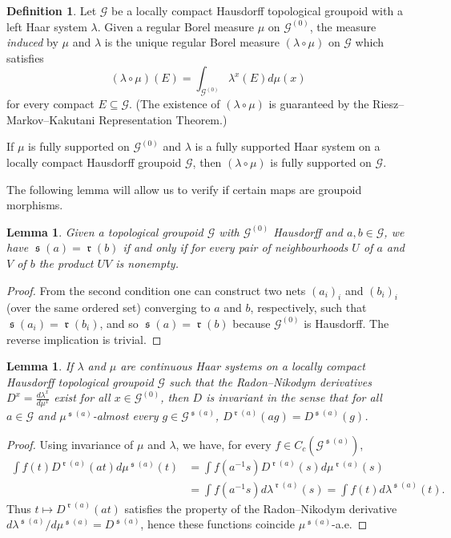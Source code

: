 \documentclass[letter,11pt]{amsart}
\theoremstyle{plain}		\newtheorem{theorem}[generalnumbering]{Theorem}
\theoremstyle{plain}		\newtheorem{corollary}[generalnumbering]{Corollary}
\theoremstyle{definition}		\newtheorem{definition}[generalnumbering]{Definition}
\theoremstyle{definition}		\newtheorem{example}[generalnumbering]{Example}
\theoremstyle{plain}		\newtheorem{proposition}[generalnumbering]{Proposition}
\theoremstyle{plain}		\newtheorem{lemma}[generalnumbering]{Lemma}
\theoremstyle{plain}    \newtheorem{plainstyle}[generalnumbering]{\namefordifferentenvironment}
\theoremstyle{plain}    \newtheorem*{plainstyle*}{\namefordifferentenvironment}
\theoremstyle{definition}    \newtheorem{definitionstyle}[generalnumbering]{\namefordifferentenvironment}
\theoremstyle{definition}    \newtheorem*{definitionstyle*}{\namefordifferentenvironment}
\DeclareMathOperator{\so}{\mathfrak{s}}
\DeclareMathOperator{\ra}{\mathfrak{r}}
\begin{document}
\begin{definition}
	Let $\mathcal{G}$ be a locally compact Hausdorff topological groupoid with a left Haar system $\lambda$. Given a regular Borel measure $\mu$ on $\mathcal{G}^{(0)}$, the measure \emph{induced} by $\mu$ and $\lambda$ is the unique regular Borel measure $(\lambda\circ\mu)$ on $\mathcal{G}$ which satisfies
	\[(\lambda\circ\mu)(E)=\int_{\mathcal{G}^{(0)}}\lambda^x(E)d\mu(x)\]
	for every compact $E\subseteq\mathcal{G}$. (The existence of $(\lambda\circ\mu)$ is guaranteed by the Riesz--Markov--Kakutani Representation Theorem.)
\end{definition}

If $\mu$ is fully supported on $\mathcal{G}^{(0)}$ and $\lambda$ is a fully supported Haar system on a locally compact Hausdorff groupoid $\mathcal{G}$, then $(\lambda\circ\mu)$ is fully supported on $\mathcal{G}$.

The following lemma will allow us to verify if certain maps are groupoid morphisms.

\begin{lemma}\label{lemmaproduct}
	Given a topological groupoid $\mathcal{G}$ with $\mathcal{G}^{(0)}$ Hausdorff and $a,b\in\mathcal{G}$, we have $\so(a)=\ra(b)$ if and only if for every pair of neighbourhoods $U$ of $a$ and $V$ of $b$ the product $UV$ is nonempty.
\end{lemma}
\begin{proof}
	From the second condition one can construct two nets $(a_i)_i$ and $(b_i)_i$ (over the same ordered set) converging to $a$ and $b$, respectively, such that $\so(a_i)=\ra(b_i)$, and so $\so(a)=\ra(b)$ because $\mathcal{G}^{(0)}$ is Hausdorff. The reverse implication is trivial.
\end{proof}

\begin{lemma}\label{lemmaderivativehaar}
	If $\lambda$ and $\mu$ are continuous Haar systems on a locally compact Hausdorff topological groupoid $\mathcal{G}$ such that the Radon--Nikodym derivatives $D^x=\frac{d\lambda^x}{d\mu^x}$ exist for all $x\in\mathcal{G}^{(0)}$, then $D$ is invariant in the sense that for all $a\in\mathcal{G}$ and $\mu^{\so(a)}$-almost every $g\in\mathcal{G}^{\so(a)}$, $D^{\ra(a)}(ag)=D^{\so(a)}(g)$.
\end{lemma}
\begin{proof}
	Using invariance of $\mu$ and $\lambda$, we have, for every $f\in C_c(\mathcal{G}^{\so(a)})$,
	\begin{align*}
	\int f(t) D^{\ra(a)}(at)d\mu^{\so(a)}(t)&=\int f(a^{-1}s)D^{\ra(a)}(s)d\mu^{\ra(a)}(s)\\
	&=\int f(a^{-1}s)d\lambda^{\ra(a)}(s)=\int f(t)d\lambda^{\so(a)}(t).
	\end{align*}
	Thus $t\mapsto D^{\ra(a)}(at)$ satisfies the property of the Radon--Nikodym derivative $d\lambda^{\so(a)}/d\mu^{\so(a)}=D^{\so(a)}$, hence these functions coincide $\mu^{\so(a)}$-a.e.\qedhere
\end{proof}
\end{document}
